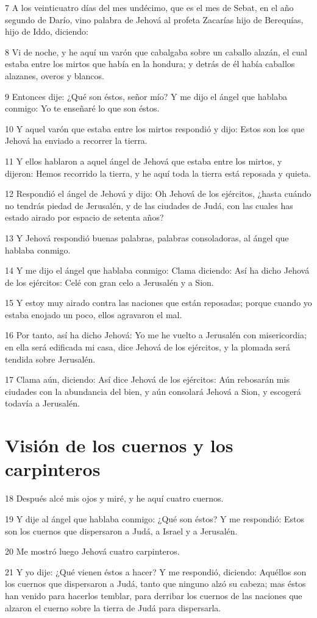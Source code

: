 \par 7 A los veinticuatro días del mes undécimo, que es el mes de Sebat, en el año segundo de Darío, vino palabra de Jehová al profeta Zacarías hijo de Berequías, hijo de Iddo, diciendo:
\par 8 Vi de noche, y he aquí un varón que cabalgaba sobre un caballo alazán, el cual estaba entre los mirtos que había en la hondura; y detrás de él había caballos alazanes, overos y blancos. 
\par 9 Entonces dije: ¿Qué son éstos, señor mío? Y me dijo el ángel que hablaba conmigo: Yo te enseñaré lo que son éstos.
\par 10 Y aquel varón que estaba entre los mirtos respondió y dijo: Estos son los que Jehová ha enviado a recorrer la tierra.
\par 11 Y ellos hablaron a aquel ángel de Jehová que estaba entre los mirtos, y dijeron: Hemos recorrido la tierra, y he aquí toda la tierra está reposada y quieta.
\par 12 Respondió el ángel de Jehová y dijo: Oh Jehová de los ejércitos, ¿hasta cuándo no tendrás piedad de Jerusalén, y de las ciudades de Judá, con las cuales has estado airado por espacio de setenta años?
\par 13 Y Jehová respondió buenas palabras, palabras consoladoras, al ángel que hablaba conmigo.
\par 14 Y me dijo el ángel que hablaba conmigo: Clama diciendo: Así ha dicho Jehová de los ejércitos: Celé con gran celo a Jerusalén y a Sion.
\par 15 Y estoy muy airado contra las naciones que están reposadas; porque cuando yo estaba enojado un poco, ellos agravaron el mal.
\par 16 Por tanto, así ha dicho Jehová: Yo me he vuelto a Jerusalén con misericordia; en ella será edificada mi casa, dice Jehová de los ejércitos, y la plomada será tendida sobre Jerusalén.
\par 17 Clama aún, diciendo: Así dice Jehová de los ejércitos: Aún rebosarán mis ciudades con la abundancia del bien, y aún consolará Jehová a Sion, y escogerá todavía a Jerusalén.

\section*{Visión de los cuernos y los carpinteros}

\par 18 Después alcé mis ojos y miré, y he aquí cuatro cuernos.
\par 19 Y dije al ángel que hablaba conmigo: ¿Qué son éstos? Y me respondió: Estos son los cuernos que dispersaron a Judá, a Israel y a Jerusalén.
\par 20 Me mostró luego Jehová cuatro carpinteros.
\par 21 Y yo dije: ¿Qué vienen éstos a hacer? Y me respondió, diciendo: Aquéllos son los cuernos que dispersaron a Judá, tanto que ninguno alzó su cabeza; mas éstos han venido para hacerlos temblar, para derribar los cuernos de las naciones que alzaron el cuerno sobre la tierra de Judá para dispersarla.

